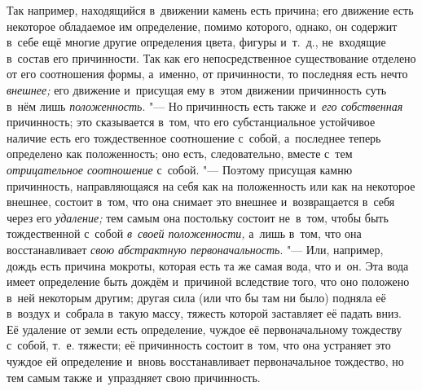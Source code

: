 Так например, находящийся в~движении камень есть причина; его движение есть
некоторое обладаемое им определение, помимо которого, однако, он содержит
в~себе ещё многие другие определения цвета, фигуры и~т.~д., не~входящие
в~состав его причинности. Так как его непосредственное существование отделено
от его соотношения формы, а~именно, от причинности, то последняя есть нечто
{\em внешнее;} его движение и~присущая ему в~этом движении причинность суть
в~нём лишь {\em положенность}. "--- Но причинность есть также и~{\em его
собственная} причинность; это сказывается в~том, что его субстанциальное
устойчивое наличие есть его тождественное соотношение с~собой, а~последнее
теперь определено как положенность; оно есть, следовательно, вместе с~тем
{\em отрицательное соотношение} с~собой. "--- Поэтому присущая камню
причинность, направляющаяся на себя как на положенность или как на некоторое
внешнее, состоит в~том, что она снимает это внешнее и~возвращается в~себя через
его {\em удаление;} тем самым она постольку состоит не~в~том, чтобы быть
тождественной с~собой {\em в~своей положенности,} а~лишь в~том, что она
восстанавливает {\em свою абстрактную первоначальность}. "--- Или, например,
дождь есть причина мокроты, которая есть та же самая вода, что и~он. Эта вода
имеет определение быть дождём и~причиной вследствие того, что оно положено
в~ней некоторым другим; другая сила (или что бы там ни было) подняла её
в~воздух и~собрала в~такую массу, тяжесть которой заставляет её падать вниз. Её
удаление от земли есть определение, чуждое её первоначальному тождеству
с~собой, т.~е. тяжести; её причинность состоит в~том, что она устраняет это
чуждое ей определение и~вновь восстанавливает первоначальное тождество, но тем
самым также и~упраздняет свою причинность.

